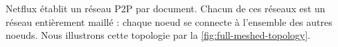 \label{sec:mute-topologie-protocole-diffusion}

Netflux établit un réseau \ac{P2P} par document.
Chacun de ces réseaux est un réseau entièrement maillé : chaque noeud se connecte à l'ensemble des autres noeuds.
Nous illustrons cette topologie par la \autoref{fig:full-meshed-topology}.

\begin{figure}[!ht]
    \centering
\end{figure}
